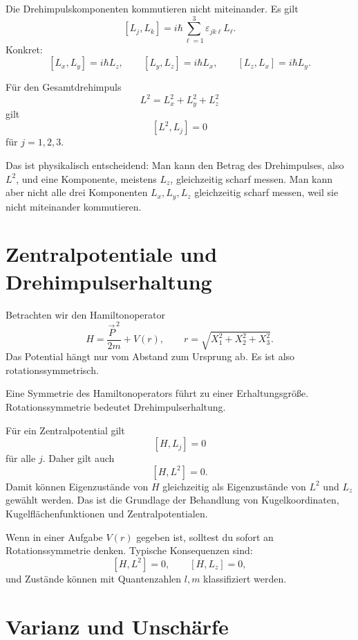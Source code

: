 Die Drehimpulskomponenten kommutieren nicht miteinander. Es gilt
\[
    [L_j,L_k]=i\hbar\sum_{\ell=1}^3\varepsilon_{jk\ell}L_\ell.
\]
Konkret:
\[
    [L_x,L_y]=i\hbar L_z,
    \qquad
    [L_y,L_z]=i\hbar L_x,
    \qquad
    [L_z,L_x]=i\hbar L_y.
\]

\begin{formulabox}
Für den Gesamtdrehimpuls
\[
    L^2=L_x^2+L_y^2+L_z^2
\]
gilt
\[
    [L^2,L_j]=0
\]
für $j=1,2,3$.
\end{formulabox}

Das ist physikalisch entscheidend: Man kann den Betrag des Drehimpulses, also $L^2$, und eine Komponente, meistens $L_z$, gleichzeitig scharf messen. Man kann aber nicht alle drei Komponenten $L_x,L_y,L_z$ gleichzeitig scharf messen, weil sie nicht miteinander kommutieren.

\section{Zentralpotentiale und Drehimpulserhaltung}

Betrachten wir den Hamiltonoperator
\[
    H=\frac{\vec P^{\,2}}{2m}+V(r),
    \qquad
    r=\sqrt{X_1^2+X_2^2+X_3^2}.
\]
Das Potential hängt nur vom Abstand zum Ursprung ab. Es ist also rotationssymmetrisch.

\begin{conceptbox}
Eine Symmetrie des Hamiltonoperators führt zu einer Erhaltungsgröße. Rotationssymmetrie bedeutet Drehimpulserhaltung.
\end{conceptbox}

Für ein Zentralpotential gilt
\[
    [H,L_j]=0
\]
für alle $j$. Daher gilt auch
\[
    [H,L^2]=0.
\]
Damit können Eigenzustände von $H$ gleichzeitig als Eigenzustände von $L^2$ und $L_z$ gewählt werden. Das ist die Grundlage der Behandlung von Kugelkoordinaten, Kugelflächenfunktionen und Zentralpotentialen.

\begin{examtipbox}
Wenn in einer Aufgabe $V(r)$ gegeben ist, solltest du sofort an Rotationssymmetrie denken. Typische Konsequenzen sind:
\[
    [H,L^2]=0,
    \qquad
    [H,L_z]=0,
\]
und Zustände können mit Quantenzahlen $l,m$ klassifiziert werden.
\end{examtipbox}

\section{Varianz und Unschärfe}

